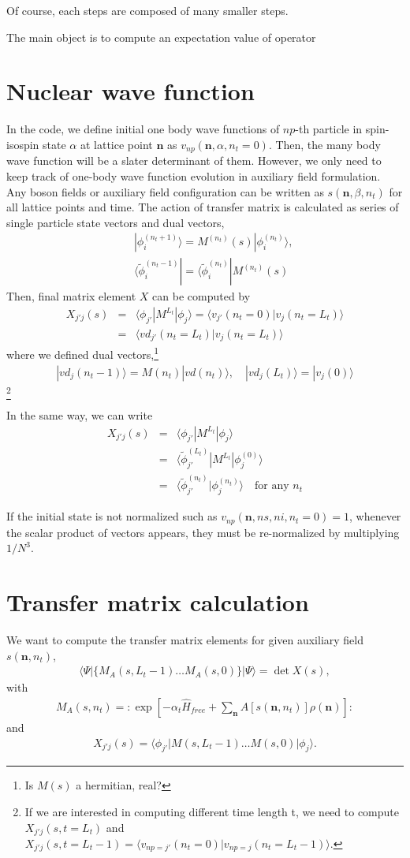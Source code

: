 \documentclass[10pt]{book}
\def\bm{\boldsymbol}
\newcommand{\bea}{\begin{eqnarray}}
\newcommand{\eea}{\end{eqnarray}}
\newcommand{\no}{\nonumber \\}
\def\vn{{\bm n}}
\def\la{\langle}
\def\ra{\rangle}
\begin{document}
Of course, each steps are composed of many smaller steps. 

The main object is to compute an expectation value of operator

\section{Nuclear wave function}  
In the code, we define initial one body wave functions of $np$-th particle in spin-isospin
state $\alpha$ at lattice point $\vn$ as $v_{np}(\vn,\alpha,n_t=0)$. Then, the many body wave 
function will be a slater determinant of them. However, we only need to keep track of
one-body wave function evolution in auxiliary field formulation. Any boson fields
or auxiliary field configuration can be written as $s(\vn,\beta, n_t)$ for all lattice points
and time. The action of transfer matrix is calculated as
series of single particle state vectors and dual vectors,
\bea 
& &|\phi_i^{(n_t+1)}\ra=M^{(n_t)}(s)|\phi_i^{(n_t)}\ra, \no  
& &\la \tilde{\phi}_i^{(n_t-1)}|= \la \tilde{\phi}_i^{(n_t)}| M^{(n_t)}(s)
\eea 
Then, final matrix element $X$ can be computed by 
\bea 
X_{j' j}(s)&=&\la \phi_{j'}| M^{L_t}|\phi_{j}\ra =
\la v_{j'}(n_t=0)|v_{j}(n_t=L_t) \ra \no 
           &=&\la vd_{j'}(n_t=L_t)|v_{j}(n_t=L_t) \ra
\eea 
where we defined dual vectors,\footnote{Is $M(s)$ a hermitian, real?}
\bea 
|vd_j(n_t-1)\ra=M(n_t)|vd(n_t)\ra ,\quad |vd_j(L_t)\ra=|v_j(0)\ra
\eea 
\footnote{
If we are interested in computing different time length t,
we need to compute $X_{j'j}(s,t=L_t)$ and 
$X_{j'j}(s,t=L_t-1)=\la v_{np=j'}(n_t=0)|v_{np=j}(n_t=L_t-1)\ra $.

} 

In the same way, we can write
\bea 
X_{j' j}(s)&=&\la \phi_{j'}| M^{L_t}|\phi_{j}\ra \no 
           &=&\la \tilde{\phi}^{(L_t)}_{j'}|M^{L_t}|\phi_j^{(0)}\ra \no 
           &=& \la \tilde{\phi}^{(n_t)}_{j'}|\phi_j^{(n_t)}\ra \quad \mbox{for any } n_t 
\eea 

If the initial state is not normalized such as $v_{np}(\vn,ns,ni,n_t=0)=1$, 
whenever the scalar product of vectors appears, they
must be re-normalized by multiplying $1/N^3$.

\section{Transfer matrix calculation }
We want to compute the transfer matrix elements for given 
auxiliary field $s(\vn,n_t)$,
\bea 
\la \Psi| \{ M_A(s,L_t-1)\dots M_A(s,0)   \} |\Psi\ra =\det X(s) , 
\eea
with  
\bea 
M_A(s,n_t)=:\exp\left[-\alpha_t \hat{H}_{free}+\sum_{\vn} A[s(\vn,n_t)] \rho(\vn) \right]:
\eea
and 
\bea 
X_{j' j}(s)=\la \phi_{j'}|M(s,L_t-1)\dots M(s,0)|\phi_{j}\ra.
\eea 
\end{document}
